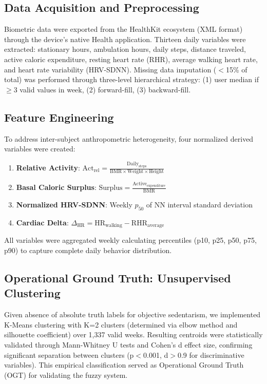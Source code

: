 \documentclass[journal,twoside,web]{ieeecolor}
\begin{document}
\subsection{Data Acquisition and Preprocessing}
Biometric data were exported from the HealthKit ecosystem (XML format) through the device's native Health application. Thirteen daily variables were extracted: stationary hours, ambulation hours, daily steps, distance traveled, active caloric expenditure, resting heart rate (RHR), average walking heart rate, and heart rate variability (HRV-SDNN). Missing data imputation ($<$15\% of total) was performed through three-level hierarchical strategy: (1) user median if $\geq$3 valid values in week, (2) forward-fill, (3) backward-fill.

\subsection{Feature Engineering}
To address inter-subject anthropometric heterogeneity, four normalized derived variables were created:

\begin{enumerate}
\item \textbf{Relative Activity}: $\text{Act}_{\text{rel}} = \frac{\text{Daily}_{\text{steps}}}{\text{BMR} \times \text{Weight} \times \text{Height}}$

\item \textbf{Basal Caloric Surplus}: $\text{Surplus} = \frac{\text{Active}_{\text{expenditure}}}{\text{BMR}}$

\item \textbf{Normalized HRV-SDNN}: Weekly $p_{50}$ of NN interval standard deviation

\item \textbf{Cardiac Delta}: $\Delta_{\text{HR}} = \text{HR}_{\text{walking}} - \text{RHR}_{\text{average}}$
\end{enumerate}

All variables were aggregated weekly calculating percentiles (p10, p25, p50, p75, p90) to capture complete daily behavior distribution.

\subsection{Operational Ground Truth: Unsupervised Clustering}
Given absence of absolute truth labels for objective sedentarism, we implemented K-Means clustering with K=2 clusters (determined via elbow method and silhouette coefficient) over 1,337 valid weeks. Resulting centroids were statistically validated through Mann-Whitney U tests and Cohen's d effect size, confirming significant separation between clusters (p$<$0.001, d$>$0.9 for discriminative variables). This empirical classification served as Operational Ground Truth (OGT) for validating the fuzzy system.
\end{document}

